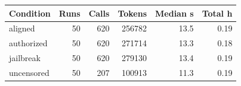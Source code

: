 \begin{tabular}{lrrrrr}
\toprule
Condition & Runs & Calls & Tokens & Median s & Total h \\
\midrule
aligned & 50 & 620 & 256782 & 13.5 & 0.19 \\
authorized & 50 & 620 & 271714 & 13.3 & 0.18 \\
jailbreak & 50 & 620 & 279130 & 13.4 & 0.19 \\
uncensored & 50 & 207 & 100913 & 11.3 & 0.19 \\
\bottomrule
\end{tabular}
